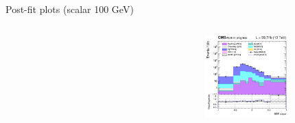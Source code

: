 \documentclass[8pt]{beamer}
\begin{document}
\begin{frame}{Post-fit plots (scalar 100 GeV)}
\begin{columns}
\begin{column}{0.33\textwidth}
\begin{center}
    		\end{center}		
		\end{column} 
		\begin{column}{0.33\textwidth}
			\begin{center}
			\begin{block}{}\end{block}	
     			\includegraphics[width=1.0\textwidth, height=90pt]{figs/postfits/2018/log_cratio_ST_topCR_ll_BDT_tDM100_TTbar_BDT_output_scalar100_customBinsAttempt7.png}
    		\end{center}		
		\end{column}
\end{columns}


\end{frame}
\end{document}
